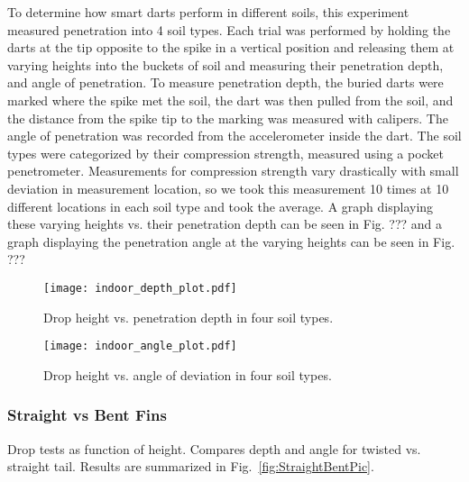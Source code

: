 To determine how smart darts perform in different soils, this experiment measured penetration into 4 soil types.  Each trial was performed by holding the darts at the tip opposite to the spike in a vertical position and releasing them at varying heights into the buckets of soil and measuring their penetration depth, and angle of penetration. To measure penetration depth, the buried darts were marked where the spike met the soil, the dart was then pulled from the soil, and the distance from the spike tip to the marking was measured with calipers. The angle of penetration was recorded from the accelerometer inside the dart. The soil types were categorized by their compression strength, measured using a pocket penetrometer. Measurements for compression strength vary drastically with small deviation in measurement location, so we took this measurement 10 times at 10 different locations in each soil type and took the average. A graph displaying these varying heights vs. their penetration depth can be seen in Fig. ??? and a graph displaying the penetration angle at the varying heights can be seen in Fig. ???

\begin{figure} \centering
{\texttt{[image: indoor\_depth\_plot.pdf]}}
\caption{Drop height vs. penetration depth in four soil types.} 
\label{fig:DepthPlotIndoors}
\end{figure}

\begin{figure} \centering
{\texttt{[image: indoor\_angle\_plot.pdf]}}
\caption{Drop height vs. angle of deviation in four soil types.} 
\label{fig:AnglePlotIndoors}
\vspace{-1em}
\end{figure}

\subsubsection{Straight vs Bent Fins}

Drop tests as function of height. Compares depth and angle for twisted vs. straight tail.
Results are summarized in Fig.~\ref{fig:StraightBentPic}.

